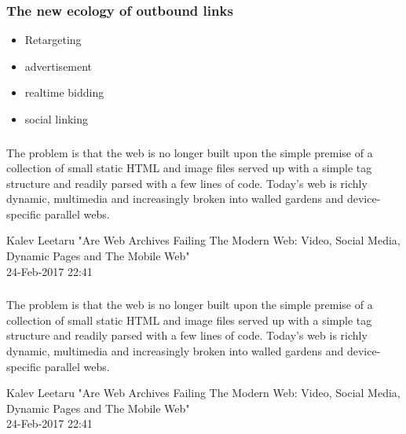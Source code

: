 \documentclass[aspectratio=169]{beamer}
\begin{document}
\begin{frame}
\frametitle{The new ecology of outbound links}
\begin{itemize}
\item{Retargeting}
\item{advertisement}
\item{realtime bidding}
\item{social linking}
\end{itemize}
\end{frame}


\begin{frame}
\frametitle{}

\epigraph{The problem is that the web is no longer built upon the simple premise of a collection of small static HTML and image files served up with a simple tag structure and readily parsed with a few lines of code. Today’s web is richly dynamic, multimedia and increasingly broken into walled gardens and device-specific parallel webs.}{Kalev Leetaru "Are Web Archives Failing The Modern Web: Video, Social Media, Dynamic Pages and The Mobile Web"\\ 24-Feb-2017 22:41}
\end{frame}

\begin{frame}
\frametitle{}
\epigraph{The problem is that the web is no longer built upon the simple premise of a collection of small static HTML and image files served up with a simple tag structure and readily parsed with a few lines of code. Today’s web is richly dynamic, multimedia and increasingly broken into walled gardens and device-specific parallel webs.}{Kalev Leetaru "Are Web Archives Failing The Modern Web: Video, Social Media, Dynamic Pages and The Mobile Web"\\ 24-Feb-2017 22:41}
\end{frame}
\end{document}
